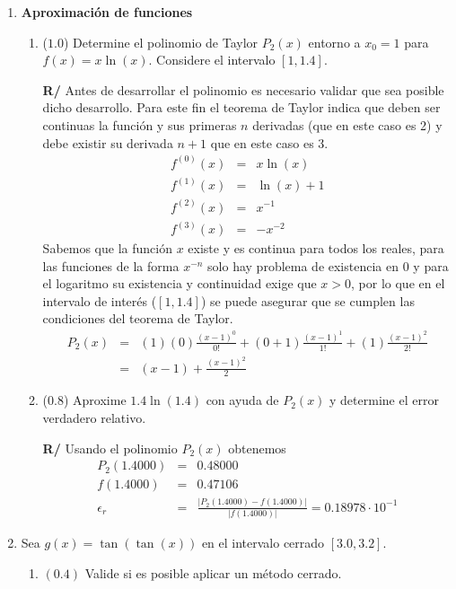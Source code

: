 \documentclass[12pt]{article}
\begin{document}
  \begin{enumerate}[leftmargin=*,widest=9]
    \item \textbf{Aproximación de funciones}
    \begin{enumerate}[label=\alph*]
    \item (\(1.0\)) Determine el polinomio de Taylor \(P_2(x)\) entorno a \(x_0=1\) para \(f(x) = x \ln(x) \). Considere el intervalo \([1, 1.4]\).

\textbf{R/} Antes de desarrollar el polinomio es necesario validar que sea posible dicho desarrollo.
   Para este fin el teorema de Taylor indica que deben ser continuas la función y sus primeras \(n\) derivadas (que en este caso es 2) y debe existir su derivada \(n+1\) que en este caso es 3.
   \begin{eqnarray*}
   f^{(0)}(x) &=& x \ln(x) \\
   f^{(1)}(x) &=& \ln(x) + 1 \\
   f^{(2)}(x) &=& x^{-1} \\
   f^{(3)}(x) &=& -x^{-2}
   \end{eqnarray*}
   Sabemos que la función \(x\) existe y es continua para todos los reales, para las funciones de la forma \(x^{-n}\) solo hay problema de existencia en \(0\) y para el logaritmo su existencia y continuidad exige que \(x>0\), por lo que en el intervalo de interés (\([1, 1.4]\)) se puede asegurar que se cumplen las condiciones del teorema de Taylor.
\begin{eqnarray*}
P_2(x) & = & (1)(0) \frac{(x-1)^0}{0!} + (0 + 1) \frac{(x-1)^1}{1!} + (1) \frac{(x-1)^2}{2!} \\
& = & (x - 1) + \frac{(x - 1)^2}{2}
\end{eqnarray*}
    \item (\(0.8\)) Aproxime \(1.4 \ln(1.4)\) con ayuda de \(P_2(x)\) y determine el error verdadero relativo.

\textbf{R/} Usando el polinomio \(P_2(x)\) obtenemos
   \begin{eqnarray*}
   P_2(1.4000) & = & 0.48000 \\
   f(1.4000) & = & 0.47106 \\
   \epsilon_r & = & \frac{| P_2(1.4000) - f(1.4000) |}{|f(1.4000)|} = 0.18978 \cdot 10^{-1}
\end{eqnarray*}      
   \end{enumerate}
   \item Sea \(g(x) = \tan(\tan(x)) \) en el intervalo cerrado \( [3.0, 3.2] \).
   \begin{enumerate}[label=\alph*]
   \item \((0.4)\) Valide si es posible aplicar un método cerrado.


\end{enumerate}
\end{enumerate}
\end{document}
